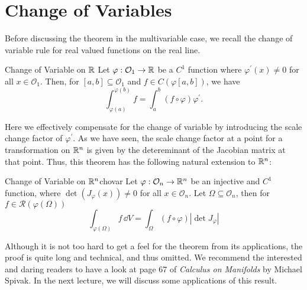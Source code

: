 \documentclass[../Analysis-3.tex]{subfiles}
\begin{document}
\section{Change of Variables}

Before discussing the theorem in the multivariable case, we recall the change of variable rule for real valued functions on the real line. 

\begin{Thm}{Change of Variable on $\mathbb{R}$}{}
  Let $\varphi : \mathcal{O}_1 \to \mathbb{R}$ be a $C^1$ function where $\varphi^\prime(x) \neq 0$ for all $x \in \mathcal{O}_1$. Then, for $[a,b] \subseteq \mathcal{O}_1$ and $f \in C(\varphi[a,b])$, we have
  \[
    \int_{\varphi(a)}^{\varphi(b)} f = \int_a^b (f \circ \varphi) \varphi^\prime.
  \]
\end{Thm}

Here we effectively compensate for the change of variable by introducing the scale change factor of $\varphi^\prime$. As we have seen, the scale change factor at a point for a transformation on $\mathbb{R}^n$ is given by the detereminant of the Jacobian matrix at that point. Thus, this theorem has the following natural extension to $\mathbb{R}^n$:\\ 

\begin{Thm}{Change of Variable on $\mathbb{R}^n$}{chovar}
  Let $\varphi : \mathcal{O}_n \to \mathbb{R}^n$ be an injective and $C^1$ function, where $\det(J_{\varphi}(x)) \neq 0$ for all $x \in \mathcal{O}_n$. Let $\Omega \subseteq \mathcal{O}_n$, then for $f \in \mathscr{R}(\varphi(\Omega))$
  \[
    \int_{\varphi(\Omega)} f \, \dd V = \int_{\Omega} (f \circ \varphi) |\det J_{\varphi}|
  \]
\end{Thm}

Although it is not too hard to get a feel for the theorem from its applications, the proof is quite long and technical, and thus omitted. We recommend the interested and daring readers to have a look at page 67 of \textit{Calculus on Manifolds} by Michael Spivak. In the next lecture, we will discuss some applications of this result.
\end{document}
